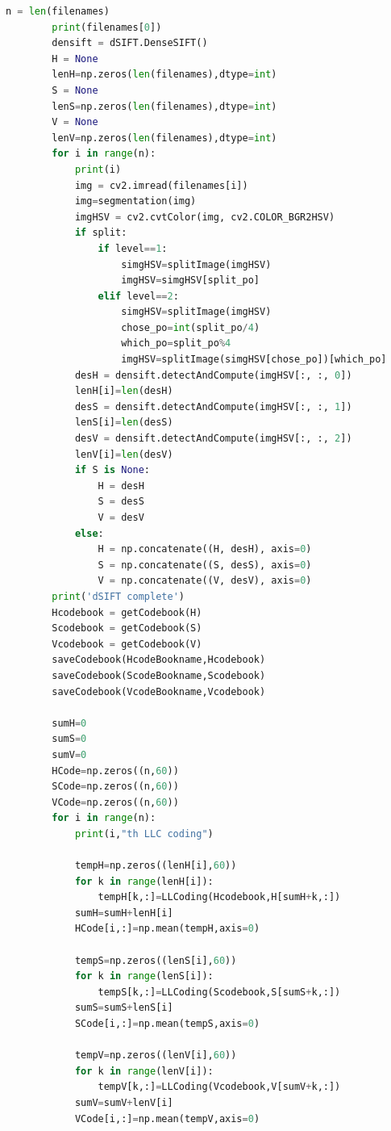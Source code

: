 \documentclass[supercite]{HustGraduPaper}
\begin{document}
\begin{sloppypar}
\begin{appendices}
\begin{spacing}{1.25}
\begin{lstlisting}[language=python]
        n = len(filenames)
        print(filenames[0])
        densift = dSIFT.DenseSIFT()
        H = None
        lenH=np.zeros(len(filenames),dtype=int)
        S = None
        lenS=np.zeros(len(filenames),dtype=int)
        V = None
        lenV=np.zeros(len(filenames),dtype=int)
        for i in range(n):
            print(i)
            img = cv2.imread(filenames[i])
            img=segmentation(img)
            imgHSV = cv2.cvtColor(img, cv2.COLOR_BGR2HSV)
            if split:
                if level==1:
                    simgHSV=splitImage(imgHSV)
                    imgHSV=simgHSV[split_po]
                elif level==2:
                    simgHSV=splitImage(imgHSV)
                    chose_po=int(split_po/4)
                    which_po=split_po%4
                    imgHSV=splitImage(simgHSV[chose_po])[which_po]
            desH = densift.detectAndCompute(imgHSV[:, :, 0])
            lenH[i]=len(desH)
            desS = densift.detectAndCompute(imgHSV[:, :, 1])
            lenS[i]=len(desS)
            desV = densift.detectAndCompute(imgHSV[:, :, 2])
            lenV[i]=len(desV)
            if S is None:
                H = desH
                S = desS
                V = desV
            else:
                H = np.concatenate((H, desH), axis=0)
                S = np.concatenate((S, desS), axis=0)
                V = np.concatenate((V, desV), axis=0)
        print('dSIFT complete')
        Hcodebook = getCodebook(H)
        Scodebook = getCodebook(S)
        Vcodebook = getCodebook(V)
        saveCodebook(HcodeBookname,Hcodebook)
        saveCodebook(ScodeBookname,Scodebook)
        saveCodebook(VcodeBookname,Vcodebook)
    
        sumH=0
        sumS=0
        sumV=0
        HCode=np.zeros((n,60))
        SCode=np.zeros((n,60))
        VCode=np.zeros((n,60))
        for i in range(n):
            print(i,"th LLC coding")
    
            tempH=np.zeros((lenH[i],60))
            for k in range(lenH[i]):
                tempH[k,:]=LLCoding(Hcodebook,H[sumH+k,:])
            sumH=sumH+lenH[i]
            HCode[i,:]=np.mean(tempH,axis=0)
    
            tempS=np.zeros((lenS[i],60))
            for k in range(lenS[i]):
                tempS[k,:]=LLCoding(Scodebook,S[sumS+k,:])
            sumS=sumS+lenS[i]
            SCode[i,:]=np.mean(tempS,axis=0)
    
            tempV=np.zeros((lenV[i],60))
            for k in range(lenV[i]):
                tempV[k,:]=LLCoding(Vcodebook,V[sumV+k,:])
            sumV=sumV+lenV[i]
            VCode[i,:]=np.mean(tempV,axis=0)
    

\end{lstlisting}
\end{spacing}
\end{appendices}
\end{sloppypar}
\end{document}
